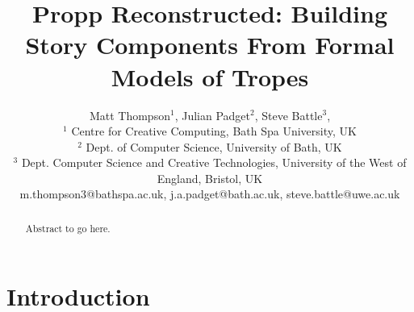 \documentclass{article}
\title{Propp Reconstructed: Building Story Components From Formal Models of Tropes}
\author{
Matt Thompson$^1$, 
Julian Padget$^2$, 
Steve Battle$^3$, 
\\ 
$^1$ Centre for Creative Computing, Bath Spa University, UK \\
$^2$ Dept. of Computer Science, University of Bath, UK \\
$^3$ Dept. Computer Science and Creative Technologies, University of the West of
England, Bristol, UK \\
%
m.thompson3@bathspa.ac.uk,
j.a.padget@bath.ac.uk,
steve.battle@uwe.ac.uk
}
\begin{document}
\maketitle

\begin{abstract}
  Abstract to go here.
\end{abstract}

\section{Introduction}



\end{document}
